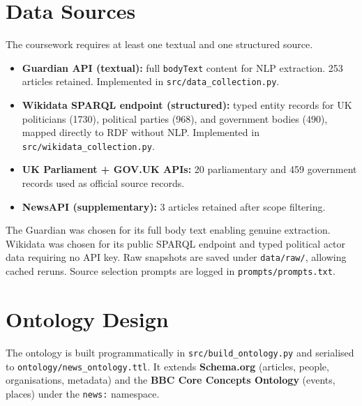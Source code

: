 \documentclass[runningheads]{llncs}
\newcommand{\filepath}[1]{%
  \begingroup\hypersetup{urlcolor=black}\nolinkurl{#1}\endgroup}
\newcommand{\code}[1]{\texttt{#1}}
\begin{document}
\section{Data Sources}\label{sec:data_sources}

The coursework requires at least one textual and one structured source.

\begin{itemize}[leftmargin=*,nosep]
    \item \textbf{Guardian API (textual):} full \code{bodyText} content for NLP
    extraction. 253 articles retained. Implemented in \filepath{src/data\_collection.py}.
    \item \textbf{Wikidata SPARQL endpoint (structured):} typed entity records for UK
    politicians (1730), political parties (968), and government bodies (490),
    mapped directly to RDF without NLP. Implemented in
    \filepath{src/wikidata\_collection.py}.
    \item \textbf{UK Parliament + GOV.UK APIs:} 20 parliamentary and 459 government
    records used as official source records.
    \item \textbf{NewsAPI (supplementary):} 3 articles retained after scope filtering.
\end{itemize}

The Guardian was chosen for its full body text enabling genuine extraction. Wikidata
was chosen for its public SPARQL endpoint and typed political actor data requiring no
API key. Raw snapshots are saved under \filepath{data/raw/}, allowing cached reruns.
Source selection prompts are logged in \filepath{prompts/prompts.txt}.

\section{Ontology Design}\label{sec:ontology_design}

The ontology is built programmatically in \filepath{src/build\_ontology.py} and
serialised to \filepath{ontology/news\_ontology.ttl}. It extends \textbf{Schema.org}
(articles, people, organisations, metadata) and the \textbf{BBC Core Concepts Ontology}
(events, places) under the \code{news:} namespace.
\end{document}
